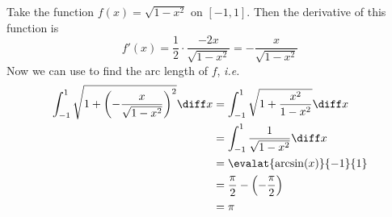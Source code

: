 \begin{exm}\label{exm-arc-length-x}
	Take the function $f(x)=\sqrt{1-x^2}$ on $[-1,1]$. Then the derivative of this function is
	\begin{equation*}
		f'(x) = \frac{1}{2}\cdot\frac{-2x}{\sqrt{1-x^2}} = -\frac{x}{\sqrt{1-x^2}}
	\end{equation*}
	Now we can use  to find the arc length of $f$, \textit{i.e.}
	\begin{align*}
		\int_{-1}^1 \sqrt{1+\left(-\frac{x}{\sqrt{1-x^2}}\right)^2} \diff x
		 & = \int_{-1}^1 \sqrt{1+\frac{x^2}{1-x^2}} \diff x \\
		 & = \int_{-1}^1 \frac{1}{\sqrt{1-x^2}} \diff x     \\
		 & = \evalat{\arcsin(x)}{-1}{1}                     \\
		 & = \frac{\pi}{2} - \left(-\frac{\pi}{2}\right)    \\
		 & = \pi
	\end{align*}
\end{exm}

